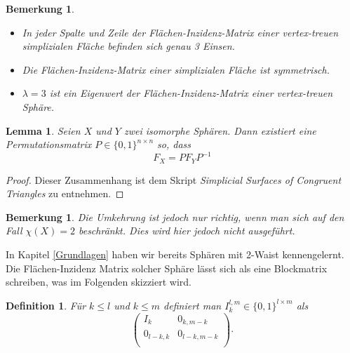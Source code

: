 \documentclass[12pt,titlepage,twoside,cleardoublepage]{article}
\theoremstyle{nummermitklammern}
\newtheorem{lemma}[temp]{Lemma}
\newtheorem{definition}[temp]{Definition}
\newtheorem{bemerkung}[temp]{Bemerkung}
\newtheorem{definition}[zahl]{Definition}
\newtheorem{lemma}[zahl]{Lemma}
\newtheorem{bemerkung}[zahl]{Bemerkung}
\numberwithin{equation}{section}
\begin{document}
\begin{bemerkung}
\begin{itemize}
\item In jeder Spalte und Zeile der Flächen-Inzidenz-Matrix einer vertex-treuen simplizialen Fläche befinden sich genau 3 Einsen. 
\item Die Flächen-Inzidenz-Matrix einer simplizialen Fläche  ist symmetrisch.
\item $\lambda =3$ ist ein Eigenwert der Flächen-Inzidenz-Matrix einer vertex-treuen Sphäre. 
\end{itemize}
\end{bemerkung}
\begin{lemma}
Seien $X$ und $Y$ zwei isomorphe Sphären. Dann existiert eine Permutationsmatrix $P\in \{0,1\}^{n \times n}$ so, dass 
\[
F_X=PF_YP^{-1}
\] 
\end{lemma}
\begin{proof}
Dieser Zusammenhang ist dem Skript \emph{Simplicial Surfaces of Congruent Triangles} zu entnehmen.
\end{proof}
\begin{comment}
\begin{proof}
Sei $\alpha:X \to Y $ ein Isomorphismus von $X$ nach $Y$. Dieser induziert eine bijektive Abbildung $\beta :X_2\to Y_2$, wobei $X_2=Y_2=\{1,\ldots,n\}$ gilt. Mithilfe der Abbildung $\beta,$ kann die Permutationsmatrix $P\in \{0,1\}^n$ mit
\[
P_{i,j}=
\Biggl\{
\begin{tabular}[l]{lcr}
1,&\textcolor{black}{$\beta(i)=j$} \\
0,& sonst\\
\end{tabular}
\]
konstruiert werden.
Dies liefert die obige Behauptung, denn es gilt
\[
(PM_YP^{-1})_{ij}=(M_Y)_{\beta(i),\beta(j)}=(M_X)_{i,j}
\] .
\end{proof}
\end{comment}
\begin{bemerkung}
Die Umkehrung ist jedoch nur richtig, wenn man sich auf den Fall $\chi(X)=2$ beschränkt.  Dies wird hier jedoch nicht ausgeführt. 
\end{bemerkung}
In Kapitel \ref{Grundlagen} haben wir bereits Sphären mit 2-Waist kennengelernt. Die Flächen-Inzidenz Matrix solcher Sphäre lässt sich als eine Blockmatrix schreiben, was im Folgenden skizziert wird.
\begin{definition}
Für $k\leq l$ und $k\leq m$ definiert man $I^{l,m}_k\in \{0,1\}^{l \times m}$ als
\[
\left( 
\begin{array}{cccc} 
  I_k & 0_{k,m-k} \\
  0_{l-k,k} & 0_{l-k,m-k}\\
\end{array} 
\right).
\]
\end{definition}
\end{document}
